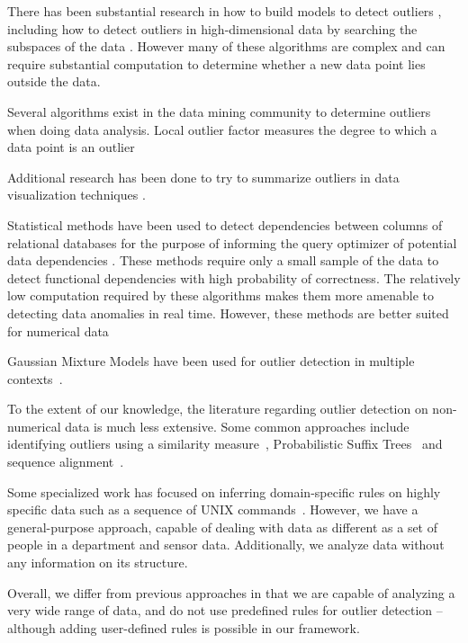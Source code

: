 
There has been substantial research in how to build models to detect outliers \cite{Aggarwal2013}, including how to detect outliers in high-dimensional data by searching the subspaces of the data \cite{Zhang2004}\cite{Kriegel2009}.
However many of these algorithms are complex and can require substantial computation to determine whether a new data point lies outside the data.

Several algorithms exist in the data mining community to determine outliers when doing data analysis.
Local outlier factor measures the degree to which a data point is an outlier

Additional research has been done to try to summarize outliers in data visualization techniques \cite{Wu}.

Statistical methods have been used to detect dependencies between columns of relational databases for the purpose of informing the query optimizer of potential data dependencies \cite{Ilyas2004}. These methods require only a small sample of the data to detect functional dependencies with high probability of correctness. The relatively low computation required by these algorithms makes them more amenable to detecting data anomalies in real time. However, these methods are better suited for numerical data~\cite{Hodge2004}

Gaussian Mixture Models have been used for outlier detection in multiple contexts~\cite{Lu2005,Roberts1994,Roberts1999}.

To the extent of our knowledge, the literature regarding outlier detection on non-numerical data is much less extensive. Some common approaches include identifying outliers using a similarity measure~\cite{Budalakoti2006}, Probabilistic Suffix Trees~\cite{Sun2006} and sequence alignment~\cite{Bouarfa2012}.

Some specialized work has focused on inferring domain-specific rules on highly specific data such as a sequence of UNIX commands~\cite{Lane1997a,Lane1997b}. However, we have a general-purpose approach, capable of dealing with data as different as a set of people in a department and sensor data. Additionally, we analyze data without any information on its structure.

Overall, we differ from previous approaches in that we are capable of analyzing a very wide range of data, and do not use predefined rules for outlier detection -- although adding user-defined rules is possible in our framework.
